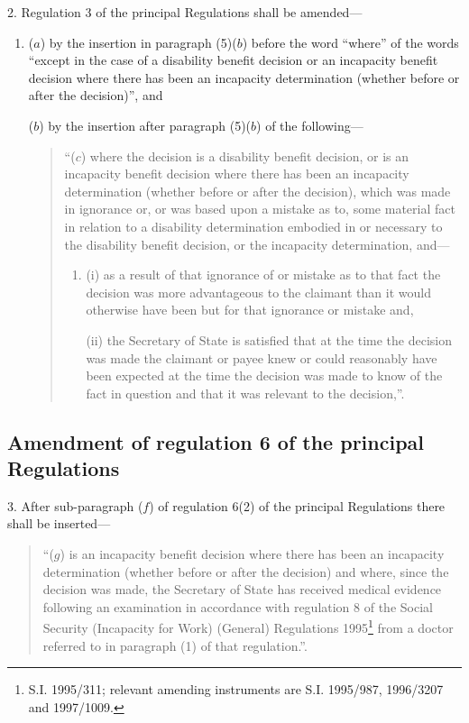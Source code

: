\documentclass[12pt,a4paper]{article}
\begin{document}
2.  Regulation 3 of the principal Regulations shall be amended---
\begin{enumerate}\item[]
($a$) by the insertion in paragraph (5)($b$) before the word “where” of the words “except in the case of a disability benefit decision or an incapacity benefit decision where there has been an incapacity determination (whether before or after the decision)”, and

($b$) by the insertion after paragraph (5)($b$) of the following---
\begin{quotation}
“($c$) where the decision is a disability benefit decision, or is an incapacity benefit decision where there has been an incapacity determination (whether before or after the decision), which was made in ignorance or, or was based upon a mistake as to, some material fact in relation to a disability determination embodied in or necessary to the disability benefit decision, or the incapacity determination, and---
\begin{enumerate}\item[]
(i) as a result of that ignorance of or mistake as to that fact the decision was more advantageous to the claimant than it would otherwise have been but for that ignorance or mistake and,

(ii) the Secretary of State is satisfied that at the time the decision was made the claimant or payee knew or could reasonably have been expected at the time the decision was made to know of the fact in question and that it was relevant to the decision,”.
\end{enumerate}
\end{quotation}
\end{enumerate}

\subsection[3. Amendment of regulation 6 of the principal Regulations]{Amendment of regulation 6 of the principal Regulations}

3.  After sub-paragraph ($f$) of regulation 6(2) of the principal Regulations there shall be inserted---
\begin{quotation}
“($g$) is an incapacity benefit decision where there has been an incapacity determination (whether before or after the decision) and where, since the decision was made, the Secretary of State has received medical evidence following an examination in accordance with regulation 8 of the Social Security (Incapacity for Work) (General) Regulations 1995\footnote{\frenchspacing S.I. 1995/311; relevant amending instruments are S.I. 1995/987, 1996/3207 and 1997/1009.} from a doctor referred to in paragraph (1) of that regulation.”.
\end{quotation}
\end{document}
